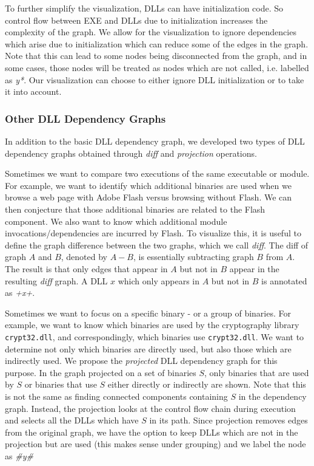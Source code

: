 To further simplify the visualization, DLLs can have initialization code.
So control flow between EXE and DLLs due to initialization increases
the complexity of the graph. We allow for the visualization to ignore
dependencies which arise due to initialization which can reduce some
of the edges in the graph.
Note that this can lead to some nodes being disconnected from the graph,
and in some cases, those nodes will be treated as nodes which are not called,
i.e. labelled as {\it *y*}.
Our visualization can choose to either ignore DLL initialization or
to take it into account.

\subsubsection{Other DLL Dependency Graphs}

In addition to the basic DLL dependency graph,
we developed two types of DLL dependency graphs obtained through
{\em diff} and {\em projection} operations.

Sometimes we want to compare two executions of the same executable or
module.
For example, we want to identify which additional binaries are used when
we browse a web page with Adobe Flash versus browsing without Flash.
We can then conjecture that those additional binaries are related to the
Flash component.
We also want to know which additional module invocations/dependencies
are incurred by Flash.
To visualize this,
it is useful to define the graph difference between the two graphs,
which we call {\em diff}.
The diff of graph $A$ and $B$, denoted by $A-B$,
is essentially subtracting graph $B$ from $A$.
The result is that only edges that appear in $A$ but not in $B$ appear
in the resulting {\em diff} graph.
A DLL $x$ which only appears in $A$ but not in $B$ is annotated
as {\it +x+}.

Sometimes we want to focus on a specific binary - or a group of binaries.
For example, we want to know which binaries are used by the cryptography
library {\tt crypt32.dll}, and correspondingly,
which binaries use {\tt crypt32.dll}.
We want to determine not only which binaries are directly used,
but also those which are indirectly used.
We propose the {\em projected} DLL dependency graph for this purpose.
In the graph projected on a set of binaries $S$,
only binaries that are used by $S$ or binaries that use $S$ either directly
or indirectly are shown.
Note that this is not the same as finding connected components containing
$S$ in the dependency graph.
Instead, the projection looks at the control flow chain during
execution and selects all the DLLs which have $S$ in its path.
Since projection removes edges from the original graph, we have the
option to keep DLLs which are not in the projection but are used
(this makes sense under grouping) and we label the node as {\it \#y\#}

